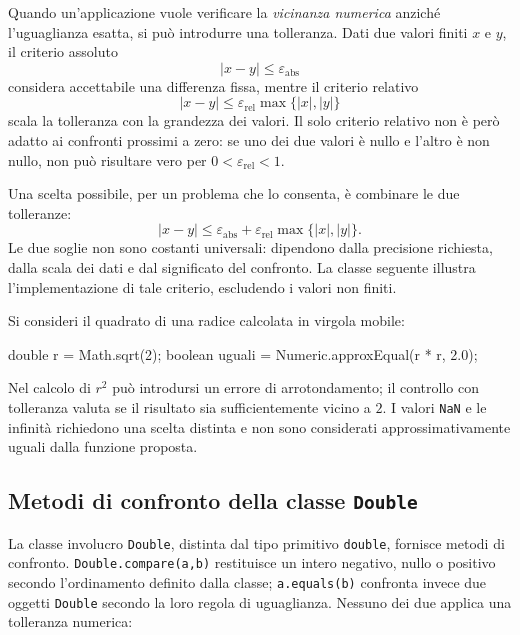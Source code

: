 Quando un'applicazione vuole verificare la
\emph{vicinanza numerica} anziché l'uguaglianza esatta,
si può introdurre una tolleranza. Dati due valori
finiti \(x\) e \(y\), il criterio assoluto
\[
  |x-y|\leq\varepsilon_{\mathrm{abs}}
\]
considera accettabile una differenza fissa, mentre il
criterio relativo
\[
  |x-y|\leq\varepsilon_{\mathrm{rel}}
  \max\{|x|,|y|\}
\]
scala la tolleranza con la grandezza dei valori.
Il solo criterio relativo non è però adatto ai
confronti prossimi a zero: se uno dei due valori è
nullo e l'altro è non nullo, non può risultare vero
per \(0<\varepsilon_{\mathrm{rel}}<1\).

Una scelta possibile, per un problema che lo consenta,
è combinare le due tolleranze:
\[
  |x-y|\leq\varepsilon_{\mathrm{abs}}+
  \varepsilon_{\mathrm{rel}}\max\{|x|,|y|\}.
\]
Le due soglie non sono costanti universali: dipendono
dalla precisione richiesta, dalla scala dei dati e
dal significato del confronto. La classe seguente
illustra l'implementazione di tale criterio, escludendo
i valori non finiti.



\begin{example}
Si consideri il quadrato di una radice calcolata in virgola mobile:

\begin{unipdcode}[language=Java]
double r = Math.sqrt(2);
boolean uguali = Numeric.approxEqual(r * r, 2.0);
\end{unipdcode}
Nel calcolo di \(r^2\) può introdursi un errore di
arrotondamento; il controllo con tolleranza valuta
se il risultato sia sufficientemente vicino a \(2\).
I valori \texttt{NaN} e le infinità richiedono una
scelta distinta e non sono considerati approssimativamente
uguali dalla funzione proposta.
\end{example}

\clearpage

\subsection{Metodi di confronto della classe \texttt{Double}}
\label{sec:fi-java-classi-double}

La classe involucro \texttt{Double}, distinta dal tipo
primitivo \texttt{double}, fornisce metodi di confronto.
\texttt{Double.compare(a,b)} restituisce un intero negativo,
nullo o positivo secondo l'ordinamento definito dalla
classe; \texttt{a.equals(b)} confronta invece due oggetti
\texttt{Double} secondo la loro regola di uguaglianza.
Nessuno dei due applica una tolleranza numerica:

